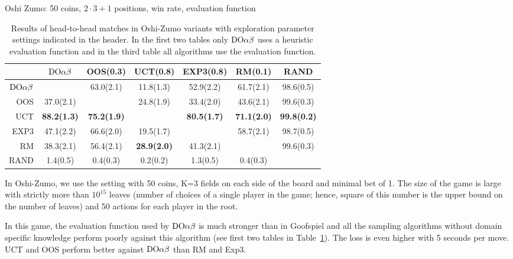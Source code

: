 \begin{table}[t!]
\begin{scriptsize}
Oshi Zumo: 50 coins, $2\cdot 3 + 1$ positions, win rate, evaluation function
\begin{tabular}{|r|cccccc|}\hline
&$\textrm{DO}\alpha\beta$&OOS(0.3)&UCT(0.8)&EXP3(0.8)&RM(0.1)&RAND\\\hline
$\textrm{DO}\alpha\beta$&&63.0(2.1)&11.8(1.3)&52.9(2.2)&61.7(2.1)&98.6(0.5)\\
OOS&37.0(2.1)&&24.8(1.9)&33.4(2.0)&43.6(2.1)&99.6(0.3)\\
UCT&\textbf{88.2(1.3)}&\textbf{75.2(1.9)}&&\textbf{80.5(1.7)}&\textbf{71.1(2.0)}&\textbf{99.8(0.2)}\\
EXP3&47.1(2.2)&66.6(2.0)&19.5(1.7)&&58.7(2.1)&98.7(0.5)\\
RM&38.3(2.1)&56.4(2.1)&\textbf{28.9(2.0)}&41.3(2.1)&&99.6(0.3)\\
RAND&1.4(0.5)&0.4(0.3)&0.2(0.2)&1.3(0.5)&0.4(0.3)&\\
\hline
\end{tabular}
\end{scriptsize}
\caption{Results of head-to-head matches in Oshi-Zumo variants with exploration parameter settings indicated in the header. In the first two tables only $\textrm{DO}\alpha\beta$ uses a heuristic evaluation function and in the third table all algorithms use the evaluation function.}\label{fig:matches:oz}
\end{table}

In Oshi-Zumo, we use the setting with 50 coins, K=3 fields on each side of the board and minimal bet of 1.
The size of the game is large with strictly more than $10^{15}$ leaves (number of choices of a single player in the game; hence, square of this number is the upper bound on the number of leaves) and 50 actions for each player in the root.

In this game, the evaluation function used by $\textrm{DO}\alpha\beta$ is much stronger than in Goofspiel and all the sampling algorithms without domain specific knowledge perform poorly against this algorithm (see first two tables in Table~\ref{fig:matches:oz}). The loss is even higher with 5 seconds per move. UCT and OOS perform better against $\textrm{DO}\alpha\beta$ than RM and Exp3.

